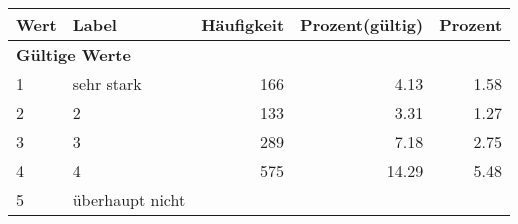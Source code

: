      \begin{longtable}{lXrrr}
     \toprule
     \textbf{Wert} & \textbf{Label} & \textbf{Häufigkeit} & \textbf{Prozent(gültig)} & \textbf{Prozent} \\
     \endhead
     \midrule
     \multicolumn{5}{l}{\textbf{Gültige Werte}}\\

     1 &
     \multicolumn{1}{X}{ sehr stark   } &


       \num{166} &
       \num[round-mode=places,round-precision=2]{4,13} &
         \num[round-mode=places,round-precision=2]{1,58} \\

     2 &
     \multicolumn{1}{X}{ 2   } &


       \num{133} &
       \num[round-mode=places,round-precision=2]{3,31} &
         \num[round-mode=places,round-precision=2]{1,27} \\

     3 &
     \multicolumn{1}{X}{ 3   } &


       \num{289} &
       \num[round-mode=places,round-precision=2]{7,18} &
         \num[round-mode=places,round-precision=2]{2,75} \\

     4 &
     \multicolumn{1}{X}{ 4   } &


       \num{575} &
       \num[round-mode=places,round-precision=2]{14,29} &
         \num[round-mode=places,round-precision=2]{5,48} \\

     5 &
     \multicolumn{1}{X}{ überhaupt nicht   } &



\end{longtable}
